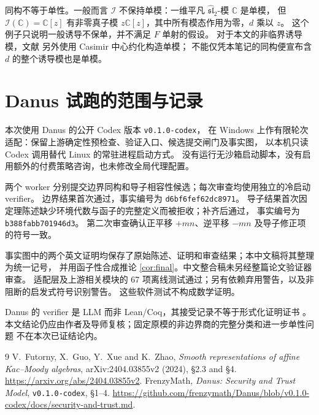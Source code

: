\documentclass[UTF8,11pt]{ctexart}
\newcommand{\C}{\mathbb C}
\newcommand{\g}{\widehat{\mathfrak{sl}}_2}
\newcommand{\I}{\mathcal I}
\theoremstyle{definition}
\begin{document}
同构不等于单性。一般而言 \(\I\) 不保持单模：一维平凡 \(\g\)-模 \(\C\) 是单模，
但 \(\I(\C)=\C[z]\) 有非零真子模 \(z\C[z]\)，其中所有模态作用为零，\(d\) 乘以 \(z\)。
这个例子只说明一般诱导不保单，并不满足 \(F\) 单射的假设。
对于本文的非临界诱导模，文献 \cite[\S4.1]{FGXZ} 另外使用 Casimir 中心约化构造单模；
不能仅凭本笔记的同构便宣布含 \(d\) 的整个诱导模也是单模。

\appendix
\section{Danus 试跑的范围与记录}

本次使用 Danus 的公开 Codex 版本 \texttt{v0.1.0-codex}，
在 Windows 上作有限轮次适配：保留上游确定性预检查、验证入口、候选提交闸门及事实图，
以本机只读 Codex 调用替代 Linux 的常驻进程启动方式。
没有运行无沙箱启动脚本，没有启用额外的付费策略咨询，也未修改全局代理配置。

两个 worker 分别提交边界同构和导子相容性候选；每次审查均使用独立的冷启动 verifier。
边界结果首次通过，事实编号为 \texttt{d6bf6fef62dc8971}。
导子结果首次因定理陈述缺少环境代数与函子的完整定义而被拒收；补齐后通过，
事实编号为 \texttt{b388fabb701946d3}。
第二次审查确认正平移 \(+mn\)、逆平移 \(-mn\) 及导子修正项的符号一致。

事实图中的两个英文证明均保存了原始陈述、证明和审查结果；本中文稿将其整理为统一记号，
并用函子性合成推论 \ref{cor:final}。中文整合稿未另经整篇论文验证器审查。
适配层及上游相关模块的 67 项离线测试通过；另有依赖弃用警告，以及非阻断的启发式符号识别警告。
这些软件测试不构成数学证明。

Danus 的 verifier 是 LLM 而非 Lean/Coq，其接受记录不等于形式化证明证书
\cite{DanusTrust}。本文结论仍应由作者及导师复核；固定原模的非边界商的完整分类和进一步单性问题
不在本次已证结论内。

\begin{thebibliography}{9}
V.~Futorny, X.~Guo, Y.~Xue and K.~Zhao,
\emph{Smooth representations of affine Kac--Moody algebras},
arXiv:2404.03855v2 (2024), \S2.3 and \S4.
\url{https://arxiv.org/abs/2404.03855v2}.
FrenzyMath, \emph{Danus: Security and Trust Model},
\texttt{v0.1.0-codex}, \S1--4.
\url{https://github.com/frenzymath/Danus/blob/v0.1.0-codex/docs/security-and-trust.md}.
\end{thebibliography}
\end{document}
